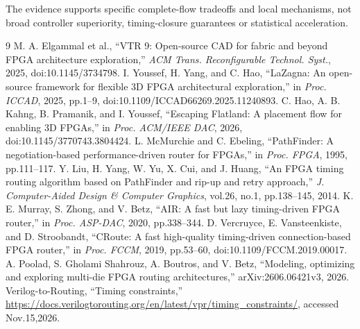 \documentclass[conference,10pt]{IEEEtran}
\begin{document}
The evidence supports specific complete-flow tradeoffs and local mechanisms, not broad controller superiority, timing-closure guarantees or statistical acceleration.
\begin{thebibliography}{9}
 M. A. Elgammal et al., ``VTR 9: Open-source CAD for fabric and beyond FPGA architecture exploration,'' \emph{ACM Trans. Reconfigurable Technol. Syst.}, 2025, doi:10.1145/3734798.
 I. Youssef, H. Yang, and C. Hao, ``LaZagna: An open-source framework for flexible 3D FPGA architectural exploration,'' in \emph{Proc. ICCAD}, 2025, pp.1--9, doi:10.1109/ICCAD66269.2025.11240893.
 C. Hao, A. B. Kahng, B. Pramanik, and I. Youssef, ``Escaping Flatland: A placement flow for enabling 3D FPGAs,'' in \emph{Proc. ACM/IEEE DAC}, 2026, doi:10.1145/3770743.3804424.
 L. McMurchie and C. Ebeling, ``PathFinder: A negotiation-based performance-driven router for FPGAs,'' in \emph{Proc. FPGA}, 1995, pp.111--117.
 Y. Liu, H. Yang, W. Yu, X. Cui, and J. Huang, ``An FPGA timing routing algorithm based on PathFinder and rip-up and retry approach,'' \emph{J. Computer-Aided Design \& Computer Graphics}, vol.26, no.1, pp.138--145, 2014.
 K. E. Murray, S. Zhong, and V. Betz, ``AIR: A fast but lazy timing-driven FPGA router,'' in \emph{Proc. ASP-DAC}, 2020, pp.338--344.
 D. Vercruyce, E. Vansteenkiste, and D. Stroobandt, ``CRoute: A fast high-quality timing-driven connection-based FPGA router,'' in \emph{Proc. FCCM}, 2019, pp.53--60, doi:10.1109/FCCM.2019.00017.
 A. Poolad, S. Gholami Shahrouz, A. Boutros, and V. Betz, ``Modeling, optimizing and exploring multi-die FPGA routing architectures,'' arXiv:2606.06421v3, 2026.
 Verilog-to-Routing, ``Timing constraints,'' \url{https://docs.verilogtorouting.org/en/latest/vpr/timing_constraints/}, accessed Nov.15,2026.
\end{thebibliography}
\end{document}
